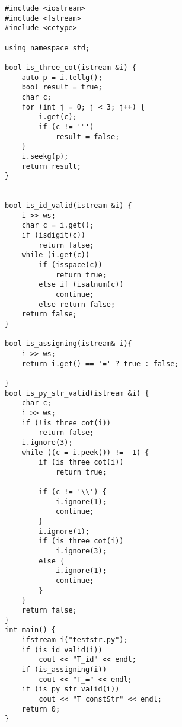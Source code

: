 \begin{latin}
    \begin{lstlisting}
#include <iostream>
#include <fstream>
#include <cctype>

using namespace std;

bool is_three_cot(istream &i) {
    auto p = i.tellg();
    bool result = true;
    char c;
    for (int j = 0; j < 3; j++) {
        i.get(c);
        if (c != '"')
            result = false;
    }
    i.seekg(p);
    return result;
}


bool is_id_valid(istream &i) {
    i >> ws;
    char c = i.get();
    if (isdigit(c))
        return false;
    while (i.get(c))
        if (isspace(c))
            return true;
        else if (isalnum(c))
            continue;
        else return false;
    return false;
}

bool is_assigning(istream& i){
    i >> ws;
    return i.get() == '=' ? true : false;

}
bool is_py_str_valid(istream &i) {
    char c;
    i >> ws;
    if (!is_three_cot(i))
        return false;
    i.ignore(3);
    while ((c = i.peek()) != -1) {
        if (is_three_cot(i))
            return true;

        if (c != '\\') {
            i.ignore(1);
            continue;
        }
        i.ignore(1);
        if (is_three_cot(i))
            i.ignore(3);
        else {
            i.ignore(1);
            continue;
        }
    }
    return false;
}
int main() {
    ifstream i("teststr.py");
    if (is_id_valid(i))
        cout << "T_id" << endl;
    if (is_assigning(i))
        cout << "T_=" << endl;
    if (is_py_str_valid(i))
        cout << "T_constStr" << endl;
    return 0;
}
    \end{lstlisting}
\end{latin}
